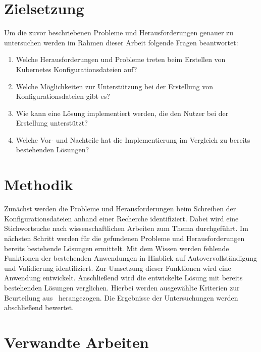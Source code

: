 \section{Zielsetzung}
Um die zuvor beschriebenen Probleme und Herausforderungen genauer zu untersuchen werden im Rahmen dieser Arbeit folgende Fragen beantwortet:
\begin{enumerate}
      \item Welche Herausforderungen und Probleme treten beim Erstellen von Kubernetes Konfigurationsdateien auf?
      \item Welche Möglichkeiten zur Unterstützung bei der Erstellung von Konfigurationsdateien gibt es?
      \item Wie kann eine Lösung implementiert werden, die den Nutzer bei der Erstellung unterstützt?
      \item Welche Vor- und Nachteile hat die Implementierung im Vergleich zu bereits bestehenden Lösungen?
\end{enumerate}


\section{Methodik}
Zunächst werden die Probleme und Herausforderungen beim Schreiben der Konfigurationsdateien anhand einer Recherche identifiziert.
Dabei wird eine Stichwortsuche nach wissenschaftlichen Arbeiten zum Thema durchgeführt.
Im nächsten Schritt werden für die gefundenen Probleme und Herausforderungen bereits bestehende Lösungen ermittelt.
Mit dem Wissen werden fehlende Funktionen der bestehenden Anwendungen in Hinblick auf Autovervollständigung und Validierung identifiziert.
Zur Umsetzung dieser Funktionen wird eine Anwendung entwickelt.
Anschließend wird die entwickelte Lösung mit bereits bestehenden Lösungen verglichen.
Hierbei werden ausgewählte Kriterien zur Beurteilung aus~\cite[A Large-Scale Study of Usability Criteria Addressed by Static Analysis Tools]{usability-criteria-static-analysis-tools} herangezogen.
Die Ergebnisse der Untersuchungen werden abschließend bewertet.

\section{Verwandte Arbeiten}\label{sec:introduction-related-work}

